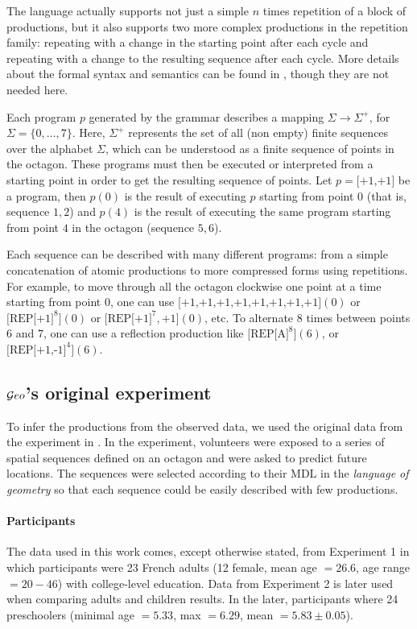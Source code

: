 The language actually supports not just a simple $n$ times repetition of a block of productions, but it also supports two more complex productions in the repetition family: repeating with a change in the starting point after each cycle and repeating with a change to the resulting sequence after each cycle. More details about the formal syntax and semantics can be found in \cite{marie2016}, though they are not needed here.

Each program $p$ generated by the grammar describes a mapping $\Sigma\to\Sigma^+$, for $\Sigma=\{0,\dots,7\}$. Here, $\Sigma^+$ represents the set of all (non empty) finite sequences over the alphabet $\Sigma$, which can be understood as a finite sequence of points in the octagon. These programs must then be executed or interpreted from a starting point in order to get the resulting sequence of points. Let $p = \textrm{[+1,+1]}$ be a program, then $p(0)$ is the result of executing $p$ starting from point $0$ (that is, sequence $1,2$) and $p(4)$ is the result of executing the same program starting from point $4$ in the octagon (sequence $5,6$).


Each sequence can be described with many different programs: from a simple concatenation of atomic productions to more compressed forms using repetitions. For example, to move through all the octagon clockwise one point at a time starting from point $0$, one can use $\textrm{[+1,+1,+1,+1,+1,+1,+1,+1]}(0)$ or $\textrm{[REP[+1]}^8](0)$ or $\textrm{[REP[+1]}^7,\textrm{+1]}(0)$, etc. To alternate $8$ times between points $6$ and $7$, one can use a reflection production like $\textrm{[REP[A]}^8](6)$, or $\textrm{[REP[+1,-1]}^4](6)$.

\subsection{$\mathcal Geo$'s original experiment}

To infer the productions from the observed data, we used the original data from the experiment in \cite{marie2016}. In the experiment, volunteers were exposed to a series of spatial sequences defined on an octagon and were asked to predict future locations. The sequences were selected according to their MDL in the \textit{language of geometry} so that each sequence could be easily described with few productions.

\paragraph{Participants} The data used in this work comes, except otherwise stated, from Experiment 1 in which participants were 23 French adults (12 female, mean age $= 26.6$, age range $= 20 - 46$) with college-level education.
Data from Experiment 2 is later used when comparing adults and children results. In the later, participants where 24 preschoolers (minimal age $= 5.33$, max $= 6.29$, mean $= 5.83 \pm 0.05$).

